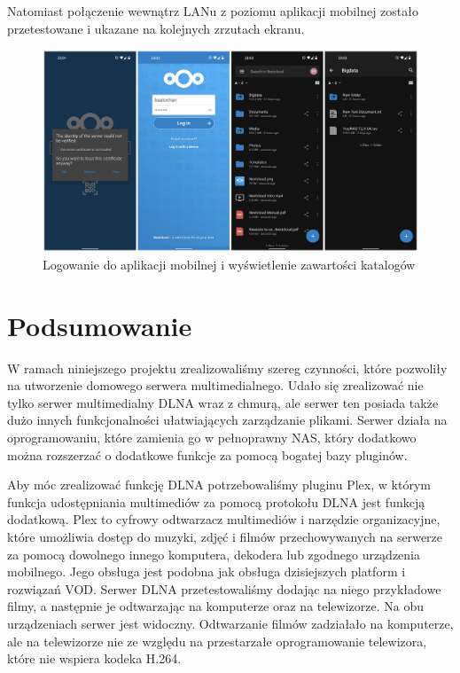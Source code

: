 \documentclass[12pt,a4paper]{article}
\newcommand{\<}{\langle}
\renewcommand{\>}{\rangle}
\theoremstyle{definition}
\begin{document}
Natomiast połączenie wewnątrz LANu z poziomu aplikacji mobilnej zostało przetestowane i ukazane na kolejnych zrzutach ekranu.

\begin{figure}[H]
    \centering
    \includegraphics[width=\linewidth]{img/ss_cloud/m7.png}
    \caption{Logowanie do aplikacji mobilnej i wyświetlenie zawartości katalogów}
\end{figure}

\newpage
\section{Podsumowanie}
W ramach niniejszego projektu zrealizowaliśmy szereg czynności, które pozwoliły na utworzenie domowego serwera multimedialnego. Udało się zrealizować nie tylko serwer multimedialny DLNA wraz z chmurą, ale serwer ten posiada także dużo innych funkcjonalności ułatwiających zarządzanie plikami. Serwer działa na oprogramowaniu, które zamienia go w pełnoprawny NAS, który dodatkowo można rozszerzać o dodatkowe funkcje za pomocą bogatej bazy pluginów. 

Aby móc zrealizować funkcję DLNA potrzebowaliśmy pluginu Plex, w którym funkcja udostępniania multimediów za pomocą protokołu DLNA jest funkcją dodatkową. Plex to cyfrowy odtwarzacz multimediów i narzędzie organizacyjne, które umożliwia dostęp do muzyki, zdjęć i filmów przechowywanych na serwerze za pomocą dowolnego innego komputera, dekodera lub zgodnego urządzenia mobilnego. Jego obsługa jest podobna jak obsługa dzisiejszych platform i rozwiązań VOD. Serwer DLNA przetestowaliśmy dodając na niego przykładowe filmy, a następnie je odtwarzając na komputerze oraz na telewizorze. Na obu urządzeniach serwer jest widoczny. Odtwarzanie filmów zadziałało na komputerze, ale na telewizorze nie ze względu na przestarzałe oprogramowanie telewizora, które nie wspiera kodeka H.264.
\end{document}
